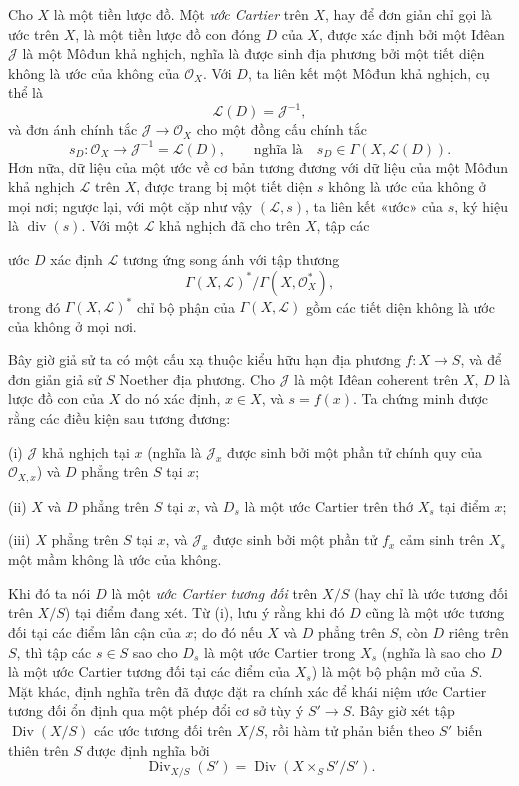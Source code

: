 \documentclass[11pt,twoside,openany]{book}
\numberwithin{equation}{section}
\newcommand{\src}[1]{%
  \phantomsection\hypertarget{src:\fgasourceid:#1}{}%
  \marginpar{\raggedleft\footnotesize\sffamily #1}%
}
\newcommand{\fgasourceid}{unset}
\begin{document}
Cho $X$ là một tiền lược đồ. Một \emph{ước Cartier} trên $X$, hay để đơn giản
chỉ gọi là ước trên $X$, là một tiền lược đồ con đóng $D$ của $X$, được xác
định bởi một Iđêan $\mathcal J$ là một Môđun khả nghịch, nghĩa là được sinh địa
phương bởi một tiết diện không là ước của không của $\mathcal O_X$. Với $D$,
ta liên kết một Môđun khả nghịch, cụ thể là
\[
\mathcal L(D)=\mathcal J^{-1},
\]
và đơn ánh chính tắc $\mathcal J\longrightarrow\mathcal O_X$ cho một đồng cấu
chính tắc
\[
s_D:\mathcal O_X\longrightarrow\mathcal J^{-1}=\mathcal L(D),
\qquad\text{nghĩa là}\quad s_D\in\Gamma(X,\mathcal L(D)).
\]
Hơn nữa, dữ liệu của một ước về cơ bản tương đương với dữ liệu của một Môđun
khả nghịch $\mathcal L$ trên $X$, được trang bị một tiết diện $s$ không là ước
của không ở mọi nơi; ngược lại, với một cặp như vậy $(\mathcal L,s)$, ta liên
kết «ước» của $s$, ký hiệu là $\operatorname{div}(s)$. Với một
$\mathcal L$ khả nghịch đã cho trên $X$, tập các
\src{151}
ước $D$ xác định $\mathcal L$ tương ứng song ánh với tập thương
\[
\Gamma(X,\mathcal L)^*/\Gamma(X,\mathcal O_X^*),
\]
trong đó $\Gamma(X,\mathcal L)^*$ chỉ bộ phận của
$\Gamma(X,\mathcal L)$ gồm các tiết diện không là ước của không ở mọi nơi.

Bây giờ giả sử ta có một cấu xạ thuộc kiểu hữu hạn địa phương
$f:X\longrightarrow S$, và để đơn giản giả sử $S$ Noether địa phương. Cho
$\mathcal J$ là một Iđêan coherent trên $X$, $D$ là lược đồ con của $X$ do nó
xác định, $x\in X$, và $s=f(x)$. Ta chứng minh được rằng các điều kiện sau
tương đương:

\noindent (i) $\mathcal J$ khả nghịch tại $x$ (nghĩa là $\mathcal J_x$ được
sinh bởi một phần tử chính quy của $\mathcal O_{X,x}$) và $D$ phẳng trên $S$
tại $x$;

\noindent (ii) $X$ và $D$ phẳng trên $S$ tại $x$, và $D_s$ là một ước Cartier
trên thớ $X_s$ tại điểm $x$;

\noindent (iii) $X$ phẳng trên $S$ tại $x$, và $\mathcal J_x$ được sinh bởi
một phần tử $f_x$ cảm sinh trên $X_s$ một mầm không là ước của không.

Khi đó ta nói $D$ là một \emph{ước Cartier tương đối} trên $X/S$ (hay chỉ là
ước tương đối trên $X/S$) tại điểm đang xét. Từ (i), lưu ý rằng khi đó $D$
cũng là một ước tương đối tại các điểm lân cận của $x$; do đó nếu $X$ và $D$
phẳng trên $S$, còn $D$ riêng trên $S$, thì tập các $s\in S$ sao cho $D_s$ là
một ước Cartier trong $X_s$ (nghĩa là sao cho $D$ là một ước Cartier tương đối
tại các điểm của $X_s$) là một bộ phận mở của $S$. Mặt khác, định nghĩa trên
đã được đặt ra chính xác để khái niệm ước Cartier tương đối ổn định qua một
phép đổi cơ sở tùy ý $S'\longrightarrow S$. Bây giờ xét tập
$\operatorname{Div}(X/S)$ các ước tương đối trên $X/S$, rồi hàm tử phản biến
theo $S'$ biến thiên trên $S$ được định nghĩa bởi
\[
\operatorname{Div}_{X/S}(S')=
\operatorname{Div}(X\times_SS'/S').
\]
\end{document}

